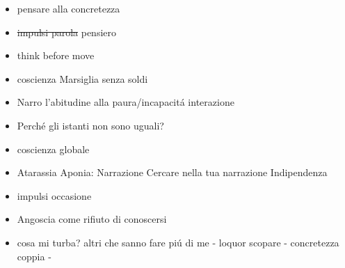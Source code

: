 \begin{itemize}
Perch\'e mi annoio?
Perch\'e soffro? Perch\'e non dico la verit\'a?
Dormire da sveglio? Perch\'e mi annoio? Come sono me? Perch\'e soffro? Perch\'e non dico la verit\'a? Quanto tempo dedico ai miei obiettivi? Quanto tempo mi resta?
Cosa significa questa pesantezza del loquor come bisogno fuga per non essere costretti a interazione??
\item pensare alla concretezza
\item \sout{impulsi parola} pensiero
\item think before move
\item coscienza Marsiglia senza soldi
\item Narro l'abitudine alla paura/incapacit\'a interazione
\item Perch\'e gli istanti non sono uguali?
\item coscienza globale
\item Atarassia Aponia: Narrazione Cercare nella tua narrazione Indipendenza
\item impulsi occasione
\item Angoscia come rifiuto di conoscersi
\item cosa mi turba? altri che sanno fare pi\'u di me - loquor scopare - concretezza coppia - 
\end{itemize}